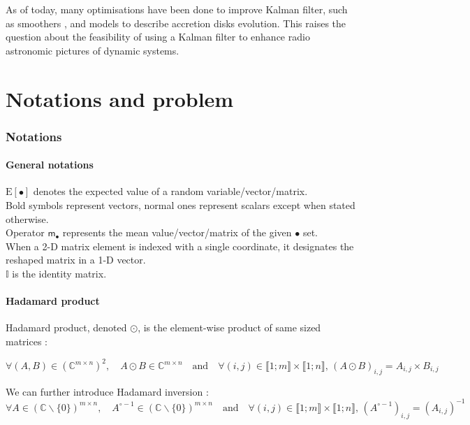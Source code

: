 \documentclass[titlepage,11pt]{article}
\newcommand{\hinv}[1]{#1^{\circ-1}} %
\newcommand{\moy}[1]{\boldsymbol{\mathsf{m}}_{#1}}
\renewcommand{\expval}[1]{\text{E}\left[#1\right]}
\begin{document}
	As of today, many optimisations have been done to improve Kalman filter, such as smoothers \cite{RTS}, and models to describe accretion disks evolution. This raises the question about the feasibility of using a Kalman filter to enhance radio astronomic pictures of dynamic systems.
	
	\newpage
	\part{Notations and problem}
	\section{Notations}
	
	\subsection{General notations}
	
	$\expval{\bullet}$ denotes the expected value of a random variable/vector/matrix.\\
	
	Bold symbols represent vectors, normal ones represent scalars except when stated otherwise.\\
	
	Operator $\moy{\bullet}$ represents the mean value/vector/matrix of the given $\bullet$ set.\\
	
	When a 2-D matrix element is indexed with a single coordinate, it designates the reshaped matrix in a 1-D vector.\\
	
	$\mathbb{I}$ is the identity matrix.
	
	
		\subsection{Hadamard product}
	
	Hadamard product, denoted $\odot$, is the element-wise product of same sized matrices :
	
	$$
	\forall (A,B)\in\left(\mathbb{C}^{m\times n}\right)^2, \quad A\odot B\in\mathbb{C}^{m\times n} \quad\text{and}\quad \forall (i,j)\in\llbracket1;m\rrbracket\times\llbracket1;n\rrbracket,\, (A\odot B)_{i,j} = A_{i,j}\times B_{i,j}
	$$
	
	We can further introduce Hadamard inversion :
	$$
	\forall A \in \left(\mathbb{C}\backslash\{0\}\right)^{m\times n},\quad \hinv{A}\in\left(\mathbb{C}\backslash\{0\}\right)^{m\times n} \quad\text{and}\quad \forall (i,j)\in\llbracket1;m\rrbracket\times\llbracket1;n\rrbracket,\, \left(\hinv{A}\right)_{i,j} = \left(A_{i,j}\right)^{-1}
	$$ 
	
\end{document}
